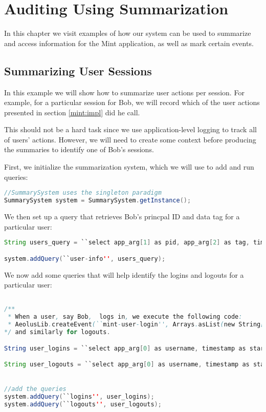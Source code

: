 \chapter{Auditing Using Summarization}

In this chapter we visit examples of how our system can be used to summarize and access information for the Mint application, as well as mark certain events.

\section{Summarizing User Sessions}
\label{sum:sessions}
In this example we will show how to summarize user actions per session. For example, for a particular session for Bob, we will record which of the user actions presented in section \ref{mint:impl} did he call.

This should not be a hard task since we use application-level logging to track all of users' actions. However, we will need to create some context before producing the summaries to identify one of Bob's sessions.

First, we initialize the summarization system, which we will use to add and run queries:

\begin{lstlisting}[language=Java]
//SummarySystem uses the singleton paradigm
SummarySystem system = SummarySystem.getInstance();
\end{lstlisting}

We then set up a query that retrieves Bob's princpal ID and data tag for a particular user:

\begin{lstlisting}[language=Java]
String users_query = ``select app_arg[1] as pid, app_arg[2] as tag, timestamp as signed_up, event_counter from events where app_op='mint-user-signup' and app_arg[0] = ?'';

system.addQuery(``user-info'', users_query);
\end{lstlisting}

\noindent
We now add some queries that will help identify the logins and logouts for a particular user:

\begin{lstlisting}[language=Java]

/**
 * When a user, say Bob,  logs in, we execute the following code:
 * AeolusLib.createEvent(``mint-user-login'', Arrays.asList(new String[]{``Bob''}));
*/ and similarly for logouts.

String user_logins = ``select app_arg[0] as username, timestamp as start, event_counter from events where app_op='mint-user-login and app_arg[0]=?''';

String user_logouts = ``select app_arg[0] as username, timestamp as start, event_counter from events where app_op='mint-user-login and app_arg[0]=?''';


//add the queries
system.addQuery(``logins'', user_logins);
system.addQuery(``logouts'', user_logouts);
\end{lstlisting}


